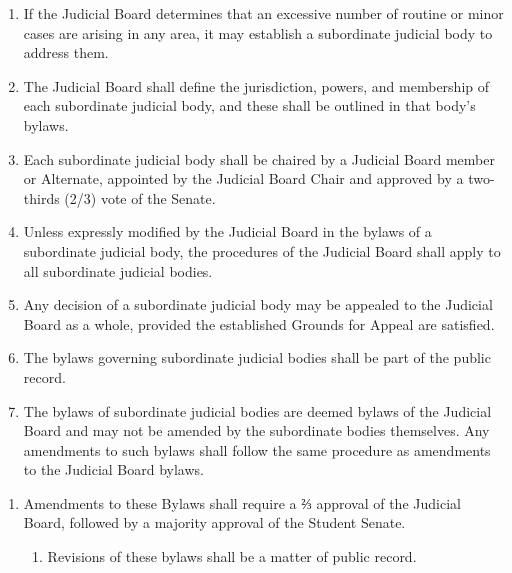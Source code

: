 \begin{enumerate}
\item If the Judicial Board determines that an excessive number of routine or minor cases are arising in any area, it may establish a subordinate judicial body to address them. 
\item The Judicial Board shall define the jurisdiction, powers, and membership of each subordinate judicial body, and these shall be outlined in that body’s bylaws. 
\item Each subordinate judicial body shall be chaired by a Judicial Board member or Alternate, appointed by the Judicial Board Chair and approved by a two-thirds (2/3) vote of the Senate.
\item Unless expressly modified by the Judicial Board in the bylaws of a subordinate judicial body, the procedures of the Judicial Board shall apply to all subordinate judicial bodies. 
\item Any decision of a subordinate judicial body may be appealed to the Judicial Board as a whole, provided the established Grounds for Appeal are satisfied. 
\item The bylaws governing subordinate judicial bodies shall be part of the public record. 
\item The bylaws of subordinate judicial bodies are deemed bylaws of the Judicial Board and may not be amended by the subordinate bodies themselves. Any amendments to such bylaws shall follow the same procedure as amendments to the Judicial Board bylaws.
\end{enumerate}


\begin{enumerate}
\item Amendments to these Bylaws shall require a ⅔ approval of the Judicial Board, followed by a majority approval of the Student Senate. 
  \begin{enumerate}
  \item Revisions of these bylaws shall be a matter of public record.
  \end{enumerate}
\end{enumerate}

